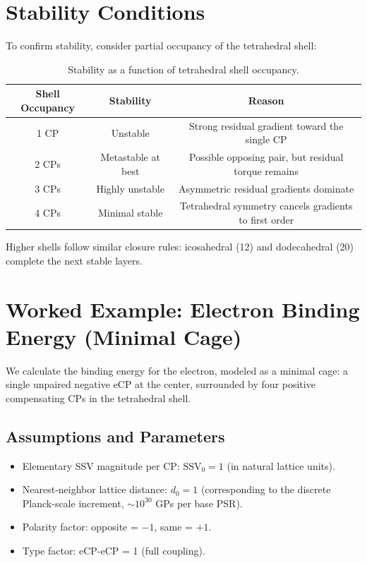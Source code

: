 \documentclass[11pt]{article}
\begin{document}
\section{Stability Conditions}

To confirm stability, consider partial occupancy of the tetrahedral shell:

\begin{table}[h]
\centering
\begin{tabular}{ccc}
\toprule
Shell Occupancy & Stability & Reason \\
\midrule
1 CP & Unstable & Strong residual gradient toward the single CP \\
2 CPs & Metastable at best & Possible opposing pair, but residual torque remains \\
3 CPs & Highly unstable & Asymmetric residual gradients dominate \\
4 CPs & Minimal stable & Tetrahedral symmetry cancels gradients to first order \\
\bottomrule
\end{tabular}
\caption{Stability as a function of tetrahedral shell occupancy.}
\label{tab:stability}
\end{table}

Higher shells follow similar closure rules: icosahedral (12) and dodecahedral (20) complete the next stable layers.

\section{Worked Example: Electron Binding Energy (Minimal Cage)}

We calculate the binding energy for the electron, modeled as a minimal cage: a single unpaired negative eCP at the center, surrounded by four positive compensating CPs in the tetrahedral shell.

\subsection{Assumptions and Parameters}
\begin{itemize}
    \item Elementary SSV magnitude per CP: $\text{SSV}_0 = 1$ (in natural lattice units).
    \item Nearest-neighbor lattice distance: $d_0 = 1$ (corresponding to the discrete Planck-scale increment, $\sim 10^{30}$ GPs per base PSR).
    \item Polarity factor: opposite = $-1$, same = $+1$.
    \item Type factor: eCP-eCP = 1 (full coupling).
\end{itemize}
\end{document}
